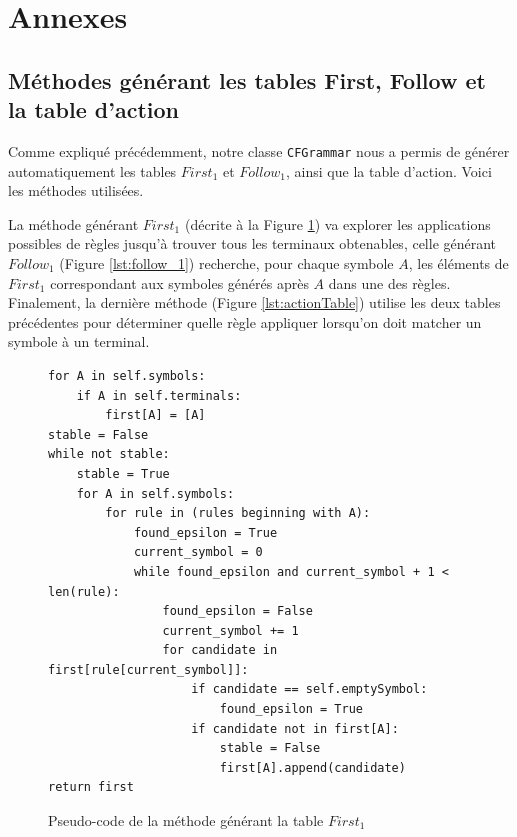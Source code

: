 \documentclass[a4paper,10pt]{article}
\begin{document}

\pagebreak

\section{Annexes}

\subsection{Méthodes générant les tables First, Follow et la table d'action}

\label{anx:FirstFollowAT}

Comme expliqué précédemment, notre classe \verb?CFGrammar? nous a permis de générer automatiquement les tables $First_1$ et $Follow_1$, ainsi que la table d'action. Voici les méthodes utilisées.

La méthode générant $First_1$ (décrite à la Figure \ref{lst:first_1}) va explorer les applications possibles de règles jusqu'à trouver tous les terminaux obtenables, celle générant $Follow_1$ (Figure \ref{lst:follow_1}) recherche, pour chaque symbole $A$, les éléments de $First_1$ correspondant aux symboles générés après $A$ dans une des règles. Finalement, la dernière méthode (Figure \ref{lst:actionTable}) utilise les deux tables précédentes pour déterminer quelle règle appliquer lorsqu'on doit matcher un symbole à un terminal.

\begin{figure}[H]
\begin{lstlisting}
for A in self.symbols:
	if A in self.terminals:
		first[A] = [A]
stable = False
while not stable:
	stable = True
	for A in self.symbols:
		for rule in (rules beginning with A):
			found_epsilon = True
			current_symbol = 0
			while found_epsilon and current_symbol + 1 < len(rule):
				found_epsilon = False
				current_symbol += 1
				for candidate in first[rule[current_symbol]]:
					if candidate == self.emptySymbol:
						found_epsilon = True
					if candidate not in first[A]:
						stable = False
						first[A].append(candidate)
return first
\end{lstlisting}
\fontfamily{}
\caption{Pseudo-code de la méthode générant la table $First_1$}
\label{lst:first_1}
\end{figure}
\end{document}

